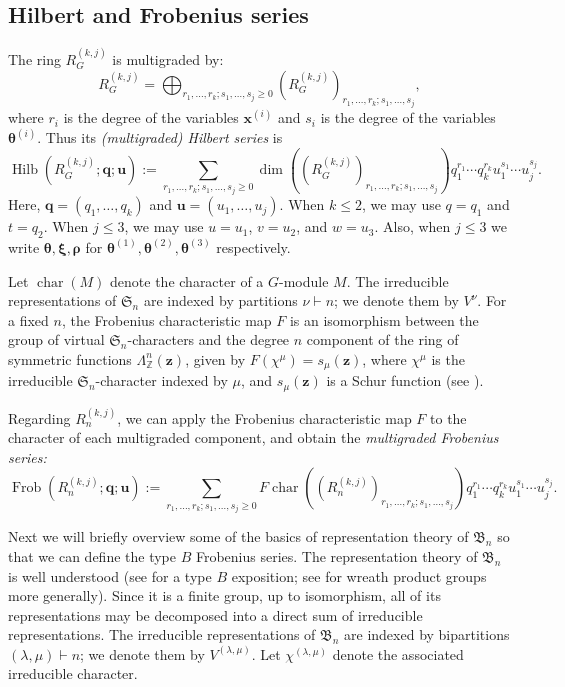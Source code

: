 \documentclass[12pt]{amsart}
\theoremstyle{plain}
\theoremstyle{definition}
\DeclareMathOperator{\Frob}{Frob}
\DeclareMathOperator{\Hilb}{Hilb}
\DeclareMathOperator{\ch}{char}
\newcommand{\Z}{\mathbb{Z}}
\newcommand{\z}{\mathbf{z}}
\begin{document}
\subsection{Hilbert and Frobenius series}
The ring $R_G^{(k,j)}$ is multigraded by:
\begin{equation}\label{eq:R-grading-Hilbert}
R_G^{(k,j)} = \bigoplus_{r_1,\ldots,r_k; s_1, \ldots, s_j \geq 0} (R_G^{(k,j)})_{r_1,\ldots,r_k; s_1, \ldots, s_j},
\end{equation}
where $r_i$ is the degree of the variables $\bm{x}^{(i)}$ and $s_i$ is the degree of the variables $\bm{\theta}^{(i)}$.
Thus its \emph{(multigraded) Hilbert series} is
\begin{equation} 
\Hilb(R_G^{(k,j)}; \mathbf{q}; \mathbf{u}) := \sum_{r_1,\ldots,r_k; s_1, \ldots, s_j \geq 0} \dim\left((R_G^{(k,j)})_{r_1,\ldots,r_k; s_1, \ldots, s_j} \right)q_1^{r_1} \cdots q_k^{r_k}u_1^{s_1} \cdots u_j^{s_j}.
\end{equation}
Here, $\mathbf{q} = (q_1,\ldots,q_k)$ and $\mathbf{u} = (u_1,\ldots,u_j)$. 
When $k \leq 2$, we may use $q = q_1$ and $t = q_2$. 
When $j \leq 3$, we may use $u = u_1$, $v = u_2$, and $w = u_3$.
Also, when $j \leq 3$ we write $\bm{\theta}, \bm{\xi}, \bm{\rho}$  for $\bm{\theta}^{(1)},  \bm{\theta}^{(2)}, \bm{\theta}^{(3)}$ respectively.

Let $\ch(M)$ denote the character of a $G$-module $M$. 
The irreducible representations of $\mathfrak{S}_n$ are indexed by partitions $\nu \vdash n$; we denote them by $V^\nu$. 
For a fixed $n$, the Frobenius characteristic map $F$ is an isomorphism between the group of virtual $\mathfrak{S}_n$-characters and the degree $n$ component of the ring of symmetric functions $\Lambda_\Z^n(\z)$, given by $F(\chi^\mu) = s_\mu(\z)$, where $\chi^\mu$ is the irreducible $\mathfrak{S}_n$-character indexed by $\mu$, and $s_\mu(\z)$ is a Schur function (see \cite[Section 7.18]{StanleyEC2}). 

Regarding $R_n^{(k,j)}$, we can apply the Frobenius characteristic map $F$ to the character of each multigraded component, and obtain the \emph{multigraded Frobenius series:} 
\begin{equation} \Frob(R_n^{(k,j)}; \mathbf{q}; \mathbf{u}) := \sum_{r_1,\ldots,r_k; s_1, \ldots, s_j \geq 0} F\ch\left((R_n^{(k,j)})_{r_1,\ldots,r_k; s_1, \ldots, s_j} \right)q_1^{r_1} \cdots q_k^{r_k}u_1^{s_1} \cdots u_j^{s_j}.\end{equation}

Next we will briefly overview some of the basics of representation theory of $\mathfrak{B}_n$ so that we can define the type $B$ Frobenius series.
The representation theory of $\mathfrak{B}_n$ is well understood (see \cite[Section 5.5]{GeckPfeiffer} for a type $B$ exposition; see \cite[Chapter I, Appendix B]{Macdonald} for wreath product groups more generally). 
Since it is a finite group, up to isomorphism, all of its representations may be decomposed into a direct sum of irreducible representations.
The irreducible representations of $\mathfrak{B}_n$ are indexed by bipartitions $(\lambda, \mu) \vdash n$; we denote them by $V^{(\lambda, \mu)}$. 
Let $\chi^{(\lambda, \mu)}$ denote the associated irreducible character.
\end{document}
